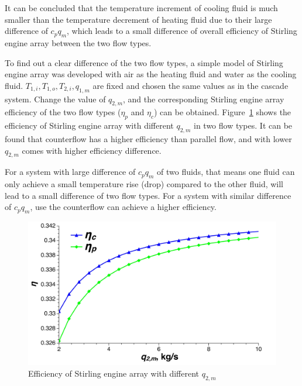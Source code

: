 It can be concluded that the temperature increment of cooling fluid is much smaller than the temperature decrement of heating fluid due to their large difference of $c_pq_m$, which leads to a small difference of overall efficiency of Stirling engine array between the two flow types.

To find out a clear difference of the two flow types, a simple model of Stirling engine array was developed with air as the heating fluid and water as the cooling fluid. $T_{1,i}, T_{1,o}, T_{2,i}, q_{1,m}$ are fixed and chosen the same values as in the cascade system. Change the value of $q_{2,m}$, and the corresponding Stirling engine array efficiency of the two flow types ($\eta_p$ and $\eta_c$) can be obtained. Figure~\ref{fig:SEAflowtypes} shows the efficiency of Stirling engine array with different $q_{2,m}$ in two flow types. It can be found that counterflow has a higher efficiency than parallel flow, and with lower $q_{2,m}$ comes with higher efficiency difference.

For a system with large difference of $c_pq_m$ of two fluids, that means one fluid can only achieve a small temperature rise (drop) compared to the other fluid, will lead to a small difference of two flow types. For a system with similar difference of $c_pq_m$, use the counterflow can achieve a higher efficiency.

\noindent \begin{figure}[H]
\begin{center}
	\includegraphics[width = 0.8\columnwidth, angle = 0]{fig/SEAflowtypes}
	\caption{Efficiency of Stirling engine array with different $q_{2,m}$}
	\label{fig:SEAflowtypes}
\end{center}
\end{figure}
